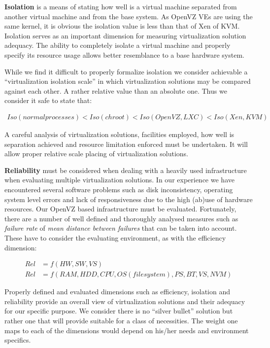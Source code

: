 \textbf{Isolation} is a means of stating how well is a virtual machine
separated from another virtual machine and from the base system. As OpenVZ VEs
are using the same kernel, it is obvious the isolation value is less than that
of Xen of KVM. Isolation serves as an important dimension for measuring
virtualization solution adequacy. The ability to completely isolate a virtual
machine and properly specify its resource usage allows better resemblance to a
base hardware system.

While we find it difficult to properly formalize isolation we consider
achievable a ``virtualization isolation scale'' in which virtualization
solutions may be compared against each other. A rather relative value than an
absolute one. Thus we consider it safe to state that:

\begin{align}
Iso(normal processes) < Iso(chroot) < Iso(OpenVZ, LXC) < Iso(Xen,KVM)
\end{align}

A careful analysis of virtualization solutions, facilities employed, how well
is separation achieved and resource limitation enforced must be undertaken. It
will allow proper relative scale placing of virtualization solutions.

\textbf{Reliability} must be considered when dealing with a heavily used
infrastructure when evaluating multiple virtualization solutions. In our
experience we have encountered several software problems such as disk
inconsistency, operating system level errors and lack of responsiveness due to
the high (ab)use of hardware resources. Our OpenVZ based infrastructure must
be evaluated. Fortunately, there are a number of well defined and thoroughly
analysed measures such as \textit{failure rate} of \textit{mean distance
between failures} that can be taken into account. These have to consider the
evaluating environment, as with the efficiency dimension:

\begin{align}
Rel & = f(HW, SW, VS)\\
Rel & = f(RAM, HDD, CPU, OS (filesystem), PS, BT, VS, NVM)
\end{align}

Properly defined and evaluated dimensions such as efficiency, isolation and
reliability provide an overall view of virtualization solutions and their
adequacy for our specific purpose. We consider there is no ``silver bullet''
solution but rather one that will provide suitable for a class of necessities.
The weight one maps to each of the dimensions would depend on his/her needs
and environment specifics.

